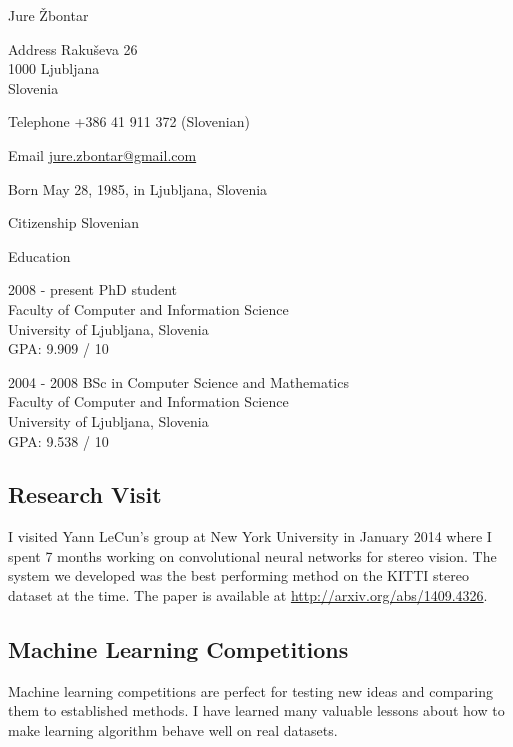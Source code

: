 \documentclass[12pt,a4paper]{article}
\begin{document}
\begin{cv}{Jure \v{Z}bontar}

\begin{cvlist}{}
\item[Address] 
Raku\v{s}eva 26 \\
1000 Ljubljana \\
Slovenia

\item[Telephone] 
+386 41 911 372 (Slovenian)

\item[Email] \href{mailto:jure.zbontar@gmail.com}{jure.zbontar@gmail.com}

\item[Born] May 28, 1985, in Ljubljana, Slovenia
\item[Citizenship] Slovenian

\end{cvlist}

\begin{cvlist}{Education}
\item[2008 - present] PhD student \\
Faculty of Computer and Information Science \\
University of Ljubljana, Slovenia \\
GPA: 9.909 / 10

\item[2004 - 2008] BSc in Computer Science and Mathematics \\
Faculty of Computer and Information Science \\
University of Ljubljana, Slovenia \\
GPA: 9.538 / 10

\end{cvlist}

\subsection*{Research Visit}
I visited Yann LeCun's group at New York University in January 2014 where I
spent 7 months working on convolutional neural networks for stereo vision. The
system we developed was the best performing method on the KITTI stereo dataset
at the time. The paper is available at \url{http://arxiv.org/abs/1409.4326}.

\subsection*{Machine Learning Competitions}
Machine learning competitions are perfect for testing new ideas and
comparing them to established methods. I have learned many valuable
lessons about how to make learning algorithm behave well on real datasets.


\end{cv}
\end{document}
